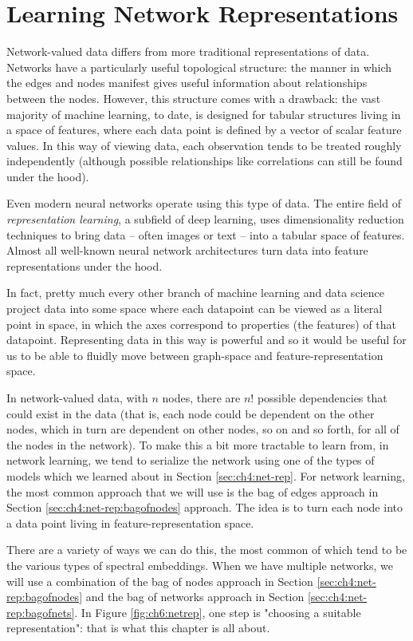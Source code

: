 \chapter{Learning Network Representations}
\label{sec:ch6}

Network-valued data differs from more traditional representations of data. Networks have a particularly useful topological structure: the manner in which the edges and nodes manifest gives useful information about relationships between the nodes. However, this structure comes with a drawback: the vast majority of machine learning, to date, is designed for tabular structures living in a space of features, where each data point is defined by a vector of scalar feature values. In this way of viewing data, each observation tends to be treated roughly independently (although possible relationships like correlations can still be found under the hood).

Even modern neural networks operate using this type of data. The entire field of \textit{representation learning}, a subfield of deep learning, uses dimensionality reduction techniques to bring data -- often images or text -- into a tabular space of features. Almost all well-known neural network architectures turn data into feature representations under the hood.

In fact, pretty much every other branch of machine learning and data science project data into some space where each datapoint can be viewed as a literal point in space, in which the axes correspond to properties (the features) of that datapoint. Representing data in this way is powerful and so it would be useful for us to be able to fluidly move between graph-space and feature-representation space.

In network-valued data, with $n$ nodes, there are $n!$ possible dependencies that could exist in the data (that is, each node could be dependent on the other nodes, which in turn are dependent on other nodes, so on and so forth, for all of the nodes in the network). To make this a bit more tractable to learn from, in network learning, we tend to serialize the network using one of the types of models which we learned about in Section \ref{sec:ch4:net-rep}. For network learning, the most common approach that we will use is the bag of edges approach in Section \ref{sec:ch4:net-rep:bagofnodes} approach. The idea is to turn each node into a data point living in feature-representation space.

There are a variety of ways we can do this, the most common of which tend to be the various types of spectral embeddings. When we have multiple networks, we will use a combination of the bag of nodes approach in Section \ref{sec:ch4:net-rep:bagofnodes} and the bag of networks approach in Section \ref{sec:ch4:net-rep:bagofnets}. In Figure \ref{fig:ch6:netrep}, one step is "choosing a suitable representation": that is what this chapter is all about.

